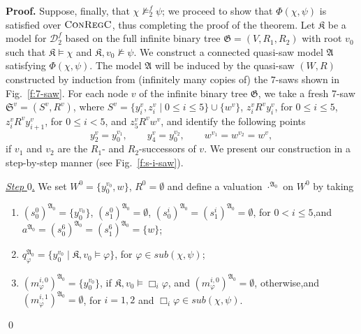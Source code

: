 \documentclass{LMCS}
\renewenvironment{proof}{\par\noindent\textbf{Proof.}}{\mbox{}\qed\par\medskip}
\theoremstyle{plain}
\newcommand{\ConR}{\textsc{ConRegC}}
\begin{document}
\begin{proof}
Suppose, finally, that $\chi \not\models^f_2 \psi$; we proceed to
show that $\Phi(\chi,\psi)$ is satisfied over $\ConR$, thus completing
the proof of the theorem.
Let $\mathfrak K$ be a model for $\mathcal{D}_2^f$ based on the full infinite binary
tree $\mathfrak G = (V,R_1,R_2)$ with root $v_0$ such that $\mathfrak
K \models \chi$ and $\mathfrak K,v_0 \not\models \psi$.  We
construct a connected quasi-saw model $\mathfrak A$ satisfying
$\Phi(\chi,\psi)$.
The model $\mathfrak A$ will be induced by the quasi-saw $(W,R)$ constructed by induction from (infinitely many copies of)
the $7$-saws shown in Fig.~\ref{f:7-saw}. For each node $v$ of the
infinite binary tree $\mathfrak{G}$, we take a fresh 7-saw $\mathfrak
S^v =(S^v,R^v)$, where $S^v = \{ y_i^v, z_i^v \mid 0 \le i \le
5 \}\cup\{w^v\}$, $z_i^v R^v y_i^v$, for $0 \le i \le
5$, $z_i^v R^v y_{i+1}^v$, for $0 \le i <
5$, and $z_5^v R^v w^v$, and identify the following points
\begin{equation*}y_2^{v} = y_0^{v_1}, \qquad y_4^{v} = y_0^{v_2}, \qquad w^{v_1} = w^{v_2} = w^{v},
\end{equation*}
if $v_1$ and $v_2$ are the $R_1$- and $R_2$-successors of $v$. We
present our construction in a step-by-step manner (see
Fig.~\ref{f:s-i-saw}).

\smallskip

\underline{\emph{Step} $0$.} We set $W^0 = \{ y_0^{v_0}, w \}$, $R^0 = \emptyset$ and define a
valuation $\cdot^{{\mathfrak A}_0}$ on $W^0$ by taking
\begin{enumerate}[$\bullet$]
\item $(s_0^0)^{{\mathfrak A}_0} = \{ y_0^{v_0} \}$, \quad $(s_1^0)^{{\mathfrak A}_0} = \emptyset$,\hfill\break
 $(s_0^i)^{{\mathfrak A}_0} = (s_1^i)^{{\mathfrak A}_0} = \emptyset$, for $0 < i \leq 5$,\quad and\quad $a^{{\mathfrak A}_0}  = (s_0^6)^{{\mathfrak A}_0} = (s_1^6)^{{\mathfrak A}_0} = \{ w \}$;
\item $q_{\varphi}^{{\mathfrak A}_0} = \bigl\{ y_0^{v_0} \mid \mathfrak K,v_0 \models \varphi\bigr\}$, for $\varphi \in \mathit{sub}(\chi,\psi)$;
\item $(m^{i,0}_{\varphi})^{{\mathfrak A}_0} = \{ y_0^{v_0} \}$, if $\mathfrak K,v_0 \models \Box_i\varphi$, and $(m^{i,0}_{\varphi})^{{\mathfrak A}_0} = \emptyset$,
otherwise,\quad and
$(m^{i,1}_{\varphi})^{{\mathfrak A}_0} = \emptyset$, for $i=1,2$ and $\Box_i\varphi \in \mathit{sub}(\chi,\psi)$.
\end{enumerate}



\end{proof}
\end{document}
